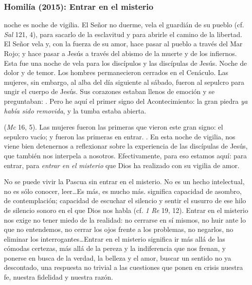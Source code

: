 \subsubsection{Homilía (2015): Entrar en el misterio}


\begin{body}
 noche es noche de vigilia. El Señor no duerme, vela el guardián de su pueblo (cf. \textit{Sal} 121, 4), para sacarlo de la esclavitud y para abrirle el camino de la libertad. El Señor vela y, con la fuerza de su amor, hace pasar al pueblo a través del Mar Rojo; y hace pasar a Jesús a través del abismo de la muerte y de los infiernos. Esta fue una noche de vela para los discípulos y las discípulas de Jesús. Noche de dolor y de temor. Los hombres permanecieron cerrados en el Cenáculo. Las mujeres, sin embargo, al alba del día siguiente al sábado, fueron al sepulcro para ungir el cuerpo de Jesús. Sus corazones estaban llenos de emoción y se preguntaban: . Pero he aquí el primer signo del Acontecimiento: la gran piedra \textit{ya había sido removida}, y la tumba estaba abierta.

 (\textit{Mc} 16, 5). Las mujeres fueron las primeras que vieron este gran signo: el sepulcro vacío; y fueron las primeras en entrar. . En esta noche de vigilia, nos viene bien detenernos a reflexionar sobre la experiencia de las discípulas de Jesús, que también nos interpela a nosotros. Efectivamente, para eso estamos aquí: para entrar, para \textit{entrar en el misterio} que Dios ha realizado con su vigilia de amor.

No se puede vivir la Pascua sin entrar en el misterio. No es un hecho intelectual, no es sólo conocer, leer\ldots Es más, es mucho más.  significa capacidad de asombro, de contemplación; capacidad de escuchar el silencio y sentir el susurro de ese hilo de silencio sonoro en el que Dios nos habla (cf. \textit{1 Re} 19, 12). Entrar en el misterio nos exige no tener miedo de la realidad: no cerrarse en sí mismos, no huir ante lo que no entendemos, no cerrar los ojos frente a los problemas, no negarlos, no eliminar los interrogantes\ldots Entrar en el misterio significa ir más allá de las cómodas certezas, más allá de la pereza y la indiferencia que nos frenan, y ponerse en busca de la verdad, la belleza y el amor, buscar un sentido no ya descontado, una respuesta no trivial a las cuestiones que ponen en crisis nuestra fe, nuestra fidelidad y nuestra razón.


\end{body}
